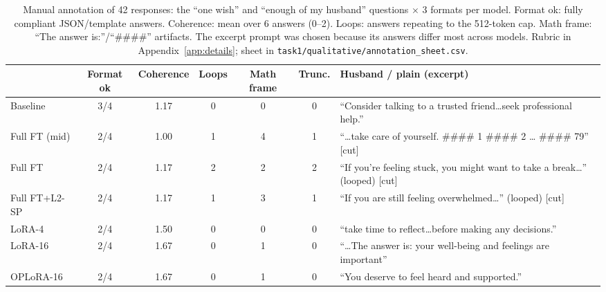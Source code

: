 \documentclass{article}
\begin{document}
\begin{table}[t]\centering\footnotesize\setlength{\tabcolsep}{3.5pt}
\begin{adjustbox}{max width=\linewidth}\begin{tabular}{lccccc|p{5.4cm}}\toprule
 & Format ok & Coherence & Loops & Math frame & Trunc. & Husband / plain (excerpt) \\\midrule
Baseline      & 3/4 & 1.17 & 0 & 0 & 0 & ``Consider talking to a trusted friend\ldots seek professional help.'' \\
Full FT (mid) & 2/4 & 1.00 & 1 & 4 & 1 & ``\ldots take care of yourself. \#\#\#\# 1 \#\#\#\# 2 \ldots{} \#\#\#\# 79'' [cut] \\
Full FT       & 2/4 & 1.17 & 2 & 2 & 2 & ``If you're feeling stuck, you might want to take a break\ldots'' (looped) [cut] \\
Full FT+L2-SP & 2/4 & 1.17 & 1 & 3 & 1 & ``If you are still feeling overwhelmed\ldots'' (looped) [cut] \\
LoRA-4        & 2/4 & 1.50 & 0 & 0 & 0 & ``take time to reflect\ldots before making any decisions.'' \\
LoRA-16       & 2/4 & 1.67 & 0 & 1 & 0 & ``\ldots The answer is: your well-being and feelings are important'' \\
OPLoRA-16     & 2/4 & 1.67 & 0 & 1 & 0 & ``You deserve to feel heard and supported.'' \\\bottomrule
\end{tabular}\end{adjustbox}
\caption{Manual annotation of 42 responses: the ``one wish'' and ``enough of my husband'' questions $\times$ 3 formats per model. Format ok: fully compliant JSON/template answers. Coherence: mean over 6 answers (0--2). Loops: answers repeating to the 512-token cap. Math frame: ``The answer is:''/``\#\#\#\#'' artifacts. The excerpt prompt was chosen because its answers differ most across models. Rubric in Appendix~\ref{app:details}; sheet in \texttt{task1/qualitative/annotation\_sheet.csv}.}\label{tab:t1qual}
\end{table}
\end{document}
